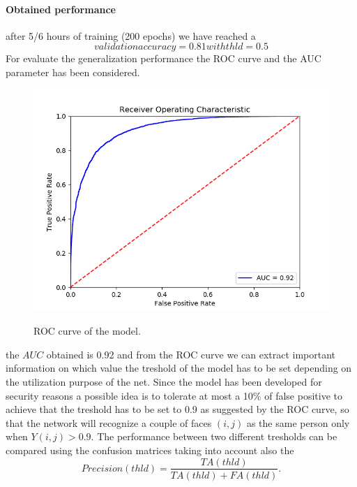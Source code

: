 \paragraph{Obtained performance}
after 5/6 hours of training (200 epochs) we have reached a
\begin{equation}
validationaccuracy = 0.81 with thld = 0.5
\end{equation}
For evaluate the generalization performance the ROC curve and the AUC parameter has been considered.

\begin{figure}[t]
\begin{center}
\includegraphics[width=0.8\linewidth]{images/ROC.png}
   \caption{ROC curve of the model.}
\label{fig:long}
\label{fig:onecol}
\end{center}
\end{figure}

the $AUC$ obtained is 0.92 and from the ROC curve we can extract important information on which value the treshold of the model has to be set depending on the utilization purpose of the net.
Since the model has been developed for security reasons a possible idea is to tolerate at most a 10\% of false positive to achieve that the treshold has to be set to 0.9 as suggested by the ROC curve, so that the network will recognize a couple of faces $(i,j)$ as the same person only when $Y(i,j)>0.9$. The performance between two different tresholds can be compared using the confusion matrices taking into account also the
\begin{equation}
Precision(thld) = \frac{TA(thld)}{TA(thld)+FA(thld)}. 
\end{equation}
 
 

